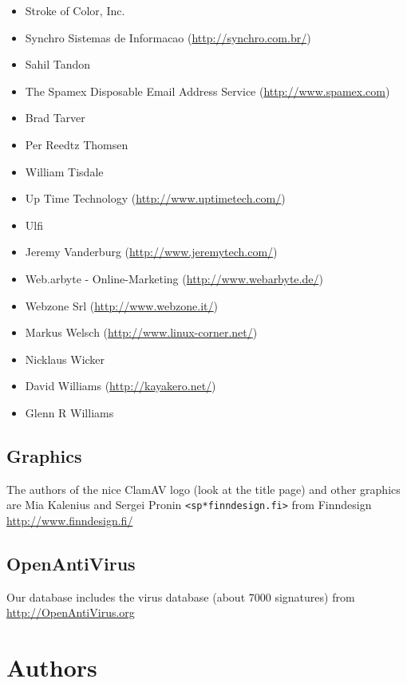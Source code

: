\documentclass[a4paper,titlepage,12pt]{article}
\newcommand{\email}[1]{\texttt{#1}}
\begin{document}
\begin{itemize}
	\item Stroke of Color, Inc.
	\item Synchro Sistemas de Informacao (\url{http://synchro.com.br/})
	\item Sahil Tandon
	\item The Spamex Disposable Email Address Service (\url{http://www.spamex.com})
	\item Brad Tarver
	\item Per Reedtz Thomsen
	\item William Tisdale
	\item Up Time Technology (\url{http://www.uptimetech.com/})
	\item Ulfi
	\item Jeremy Vanderburg (\url{http://www.jeremytech.com/})
	\item Web.arbyte - Online-Marketing (\url{http://www.webarbyte.de/})
	\item Webzone Srl (\url{http://www.webzone.it/})
	\item Markus Welsch (\url{http://www.linux-corner.net/})
	\item Nicklaus Wicker
	\item David Williams (\url{http://kayakero.net/})
	\item Glenn R Williams
    \end{itemize}

    \subsection{Graphics}
    The authors of the nice ClamAV logo (look at the title page) and other
    graphics are Mia Kalenius and Sergei Pronin \email{<sp*finndesign.fi>}
    from Finndesign \url{http://www.finndesign.fi/}

    \subsection{OpenAntiVirus}
    Our database includes the virus database (about 7000 signatures) from\\
    \url{http://OpenAntiVirus.org}

    \section{Authors}
\end{document}
